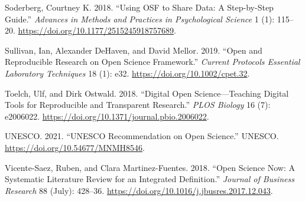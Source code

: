 \documentclass[
  a4paper,
]{article}
\newlength{\cslhangindent}
\newenvironment{CSLReferences}[2] %
 {\begin{list}{}{%
  \setlength{\itemindent}{0pt}
  \setlength{\leftmargin}{0pt}
  \setlength{\parsep}{0pt}
  \ifodd #1
   \setlength{\leftmargin}{\cslhangindent}
   \setlength{\itemindent}{-1\cslhangindent}
  \fi
  \setlength{\itemsep}{#2\baselineskip}}}
 {\end{list}}
\begin{document}
\begin{CSLReferences}{1}{0}
Soderberg, Courtney K. 2018. {``Using OSF to Share Data: A Step-by-Step
Guide.''} \emph{Advances in Methods and Practices in Psychological
Science} 1 (1): 115--20. \url{https://doi.org/10.1177/2515245918757689}.

Sullivan, Ian, Alexander DeHaven, and David Mellor. 2019. {``Open and
Reproducible Research on Open Science Framework.''} \emph{Current
Protocols Essential Laboratory Techniques} 18 (1): e32.
\url{https://doi.org/10.1002/cpet.32}.

Toelch, Ulf, and Dirk Ostwald. 2018. {``Digital Open
Science---{Teaching} Digital Tools for Reproducible and Transparent
Research.''} \emph{PLOS Biology} 16 (7): e2006022.
\url{https://doi.org/10.1371/journal.pbio.2006022}.

UNESCO. 2021. {``{UNESCO Recommendation} on {Open Science}.''} UNESCO.
\url{https://doi.org/10.54677/MNMH8546}.

Vicente-Saez, Ruben, and Clara Martinez-Fuentes. 2018. {``Open {Science}
Now: {A} Systematic Literature Review for an Integrated Definition.''}
\emph{Journal of Business Research} 88 (July): 428--36.
\url{https://doi.org/10.1016/j.jbusres.2017.12.043}.

\end{CSLReferences}
\end{document}
